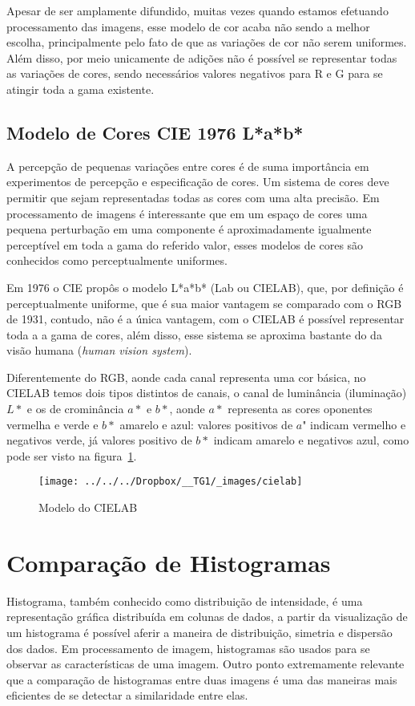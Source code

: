 \documentclass[ecp,tc]{iiufrgs}
\begin{document}
Apesar de ser amplamente difundido, muitas vezes quando estamos efetuando processamento das imagens, esse modelo de cor acaba não sendo a melhor escolha, principalmente pelo fato de que as variações de cor não serem uniformes. Além disso, por meio unicamente de adições não é possível se representar todas as variações de cores, sendo necessários valores negativos para R e G para se atingir toda a gama existente.

\subsection{Modelo de Cores CIE 1976 L*a*b*}

A percepção de pequenas variações entre cores é de suma importância em experimentos de percepção e especificação de cores. Um sistema de cores deve permitir que sejam representadas todas as cores com uma alta precisão. Em processamento de imagens é interessante que em um espaço de cores uma pequena perturbação em uma componente é aproximadamente igualmente perceptível em toda a gama do referido valor, esses modelos de cores são conhecidos como perceptualmente uniformes.

Em 1976 o CIE propôs o modelo L*a*b* (Lab ou CIELAB), que, por definição é perceptualmente uniforme, que é sua maior vantagem se comparado com o RGB de 1931, contudo, não é a única vantagem, com o CIELAB é possível representar toda a a gama de cores, além disso, esse sistema se aproxima bastante do da visão humana (\textit{human vision system}).

Diferentemente do RGB, aonde cada canal representa uma cor básica, no CIELAB temos dois tipos distintos de canais, o canal de luminância (iluminação) $ L* $ e os de crominância $a*$ e $b*$, aonde $a*$ representa as cores oponentes vermelha e verde e $b*$ amarelo e azul: valores positivos de $a$" indicam vermelho e negativos verde, já valores positivo de $b*$ indicam amarelo e negativos azul, como pode ser visto na figura~\ref{fig:cielab}.

\begin{figure}
	\centering
	\caption{Modelo do CIELAB}
	\texttt{[image: ../../../Dropbox/\_\_TG1/\_images/cielab]}
	\label{fig:cielab}
\end{figure}

\section{Comparação de Histogramas}
\label{ch:hist}
Histograma, também conhecido como distribuição de intensidade, é uma representação gráfica distribuída em colunas de dados, a partir da visualização de um histograma é possível aferir a maneira de distribuição, simetria e dispersão dos dados. Em processamento de imagem, histogramas são usados para se observar as características de uma imagem. Outro ponto extremamente relevante que a comparação de histogramas entre duas imagens é uma das maneiras mais eficientes de se detectar a similaridade entre elas.
\end{document}
